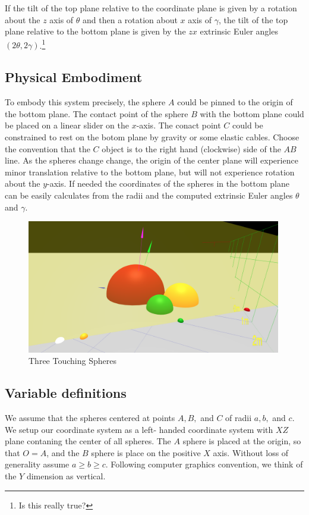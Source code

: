 \documentclass{article}
\begin{document}
If the tilt of the top plane relative to the coordinate plane is given by a rotation about the $z$ axis of $\theta$ and
then a rotation about $x$ axis of $\gamma$, the tilt of the top plane relative
to the bottom plane is given by the $zx$ extrinsic Euler angles $(2\theta, 2\gamma)$.\footnote{Is this really true?}

\subsection{Physical Embodiment}

To embody this system precisely, the sphere $A$ could be pinned to
the origin of the bottom plane.
The contact point of the sphere $B$ with the bottom plane
could be placed on a
linear slider on the $x$-axis.
The conact point $C$ could be constrained to
rest on the botom plane by gravity or some elastic cables.
Choose the convention that the $C$ object is to the right hand
(clockwise)
side of the $AB$ line.
As the spheres
change change, the origin of the center plane will experience minor translation
relative to the bottom plane, but will not experience rotation about the $y$-axis.
If needed the coordinates of the spheres in the bottom plane can be easily
calculates from the radii and the computed extrinsic Euler angles $\theta$ and $\gamma$.

\begin{figure}
     \centering
     \includegraphics[width=0.99\textwidth]{figures/StandardThreeSphereDiagram.png}
     \caption{Three Touching Spheres}
  \label{fig:fixed}
\end{figure}

\subsection{Variable definitions}

We assume that the spheres centered at points $A,B,$ and $C$
of radii $a,b,$ and $c$. We setup our coordinate system as a left-
handed coordinate system with $XZ$ plane contaning the center of all spheres.
The $A$ sphere is placed at the origin, so that $O = A$, and the $B$ sphere
is place on the positive $X$ axis. Without loss of generality assume $a \geq b \geq c$.
Following computer graphics convention, we think of the $Y$ dimension as vertical.
\end{document}
